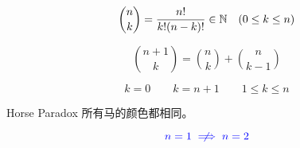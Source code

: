 \begin{frame}{}
  \begin{exampleblock}{}
    \[
      \binom{n}{k} = \frac{n!}{k! (n-k)!} \in \mathbb{N} \quad (0 \le k \le n)
    \]
  \end{exampleblock}

  \pause
  \vspace{0.30cm}
  \begin{center}
     
  \end{center}

  \pause
  \[
    \binom{n+1}{k} = \binom{n}{k} + \binom{n}{k-1}
  \]

  \pause
  \vspace{0.30cm}
  \[
    k = 0 \qquad k = n + 1 \qquad 1 \le k \le n
  \]
\end{frame}

\begin{frame}{}
  \begin{exampleblock}{Horse Paradox}
    所有马的颜色都相同。
  \end{exampleblock}

  \pause
  \vspace{0.30cm}
  \begin{center}

    \pause
  \end{center}

  \pause
  \[
    \blue{n = 1 \centernot\implies n = 2}
  \]
\end{frame}
